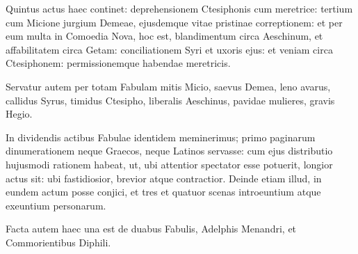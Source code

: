 Quintus actus haec continet: deprehensionem Ctesiphonis cum meretrice: tertium cum Micione jurgium Demeae, ejusdemque vitae pristinae correptionem: et per eum multa in Comoedia Nova, hoc est, blandimentum circa Aeschinum, et affabilitatem circa Getam: conciliationem Syri et uxoris ejus: et veniam circa Ctesiphonem: permissionemque habendae meretricis. 

Servatur autem per totam Fabulam mitis Micio, saevus Demea, leno avarus, callidus Syrus, timidus Ctesipho, liberalis Aeschinus, pavidae mulieres, gravis Hegio. 

In dividendis actibus Fabulae identidem meminerimus; primo paginarum dinumerationem neque Graecos, neque Latinos servasse: cum ejus distributio hujusmodi rationem habeat, ut, ubi attentior spectator esse potuerit, longior actus sit: ubi fastidiosior, brevior atque contractior. Deinde etiam illud, in eundem actum posse conjici, et tres et quatuor scenas introeuntium atque exeuntium personarum. 

Facta autem haec una est de duabus Fabulis, Adelphis Menandri, et Commorientibus Diphili.


